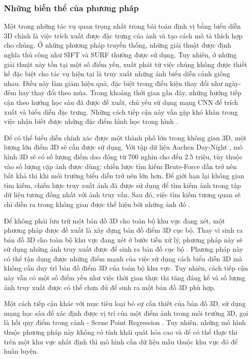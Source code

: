 \subsubsection*{Những biến thể của phương pháp}

Một trong những tác vụ quan trọng nhất trong bài toán định vị bằng biểu diễn 3D chính là việc trích xuất được đặc trưng của ảnh và tạo cách mô tả thích hợp cho chúng. Ở những phương pháp truyền thống, những giải thuật được định nghĩa thủ công như SIFT \cite{lowe2004distinctive} và SURF \cite{bay2006surf} thường được sử dụng. Tuy nhiên, ở những giải thuật này tồn tại một số điểm yếu, xuất phát từ việc chúng không được thiết kế đặc biệt cho tác vụ hiện tại là truy xuất những ảnh biểu diễn cảnh giống nhau. Điều này làm giảm hiệu quả, đặc biệt trong điều kiện thay đổi như ngày-đêm hay thay đổi theo mùa. Trong khoảng thời gian gần đây, những hướng tiếp cận theo hướng học sâu đã được đề xuất, chủ yếu sử dụng mạng CNN để trích xuất và biểu diễn đặc trưng. Những cách tiếp cận này vẫn gặp khó khăn trong việc nhận biết được những đặc điểm hình học trong hình \cite{zhou2020learn}.

Để có thể biểu diễn chính xác được một thành phố lớn trong không gian 3D, một lượng lớn điểm 3D sẽ cần được sử dụng. Với tập dữ liệu Aachen Day-Night \cite{sattler2018benchmarking}, mô hình 3D sẽ có số lượng điểm dao động từ 700 nghìn cho đến 2.5 triệu, tùy thuộc vào số lượng cặp ảnh được dùng: chiến lược tìm kiếm Brute-Force dần trở nên bất khả thi khi môi trường biểu diễn trở nên lớn hơn. Để giới hạn lại không gian tìm kiếm, chiến lược truy xuất ảnh đã được sử dụng để tìm kiếm ảnh trong tập dữ liệu tương đồng nhất với ảnh truy vấn. Sau đó, việc tìm kiếm tương quan sẽ chỉ diễn ra trong không gian được thể hiện bởi những ảnh đó \cite{sarlin2019coarse}.

Để không phải lưu trữ một bản đồ 3D cho toàn bộ khu vực đang xét, một phương pháp được đề xuất là xây dựng bản đồ điểm 3D cục bộ. Thay vì sinh ra bản đồ 3D cho toàn bộ khu vực đang xét ở bước tiền xử lý, phương pháp này sẽ sử dụng những ảnh truy xuất được để sinh ra bản đồ cục bộ \cite{sattler2017large}. Phương pháp này có thể tận dụng được những điểm mạnh của việc sử dụng cách biểu diễn 3D mà không cần duy trì bản đồ điểm 3D của toàn bộ khu vực. Tuy nhiên, cách tiếp cận này vẫn có một số điểm yếu như việc thời gian thực thi tăng đáng kể và số lượng ảnh truy xuất được có thể chưa đủ để sinh ra một bản đồ 3D phù hợp.

Một cách tiếp cận khác với mục tiêu loại bỏ sự cần thiết của bản đồ 3D, sử dụng mạng học sâu để xác định được vị trí của một điểm ảnh trong môi trường 3D, gọi là hồi quy điểm trong cảnh - Scene Point Regression \cite{brachmann2021visual}. Tuy nhiên, những mô hình thuộc phương pháp này không có tính khái quát hóa cao và để có thể thực thi trên một khu vực nhất định thì mô hình cần dữ liệu mẫu thuộc khu vực đó để huấn luyện.
\newpage
